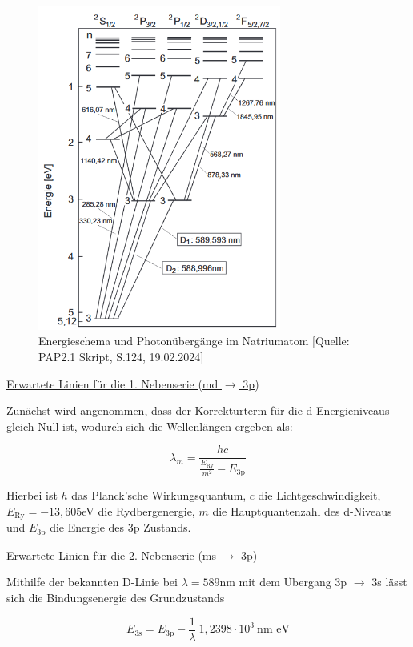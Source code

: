 \documentclass{article}
\begin{document}
\begin{figure}[!h]
    \centering
    \includegraphics[width=8cm]{graphics/energieschemaNA.png}
    \caption{Energieschema und Photonübergänge im Natriumatom [Quelle: PAP2.1 Skript, S.124, 19.02.2024]}
    \label{fig:ergSchemaNA}
\end{figure}

\underline{Erwartete Linien für die 1. Nebenserie (md $\xrightarrow{}$ 3p)}

Zunächst wird angenommen, dass der Korrekturterm für die d-Energieniveaus gleich Null ist, wodurch sich die Wellenlängen ergeben als:

\begin{equation}
    \lambda_m = \frac{hc}{\frac{E_{\text{Ry}}}{m^2} - E_{\text{3p}}}
    \label{eq:1NS}
\end{equation}

Hierbei ist $h$ das Planck'sche Wirkungsquantum, $c$ die Lichtgeschwindigkeit, $E_{\text{Ry}} = -13,605$eV die Rydbergenergie, $m$ die Hauptquantenzahl des d-Niveaus und $E_{\text{3p}}$ die Energie des 3p Zustands.

\newpage

\underline{Erwartete Linien für die 2. Nebenserie (ms $\xrightarrow{}$ 3p)}

Mithilfe der bekannten D-Linie bei $\lambda = 589$nm mit dem Übergang 3p $\xrightarrow{}$ 3s lässt sich die Bindungsenergie des Grundzustands

\begin{equation}
    E_{\text{3s}} = E_{\text{3p}} - \frac{1}{\lambda} \ 1,2398 \cdot 10^3 \ \text{nm eV}
    \label{eq:ergGrundzustand}
\end{equation}
\end{document}
